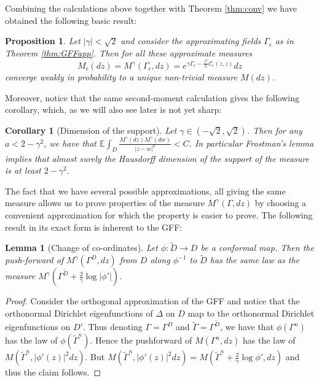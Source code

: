 \documentclass[11pt]{amsart}
\newtheorem{lemma}[thm]{Lemma}
\newtheorem{prop}[thm]{Proposition}
\newtheorem{cor}[thm]{Corollary}
\newcommand{\C}{\mathcal C}
\newcommand{\E}{\mathbb E}
\renewcommand{\1}{\mathbf 1}
\newcommand{\eps}{\epsilon}
\begin{document}
Combining the calculations above together with Theorem \ref{thm:conv} we have obtained the following basic result:

\begin{prop}\label{prop:basic}
Let $|\gamma| < \sqrt{2}$ and consider the approximating fields $\Gamma_\eps$ as in Theorem \ref{thm:GFFapp}. Then for all these approximate measures $$M_\eps(dz) = M^\gamma(\Gamma_\eps, dz) = e^{\gamma \Gamma_\eps - \frac{\gamma^2}{2}\C_\eps(z,z)}dz$$
converge weakly in probability to a unique non-trivial measure $M(dz)$.
\end{prop}

Moreover, notice that the same second-moment calculation gives the following corollary, which, as we will also see later is not yet sharp:

\begin{cor}[Dimension of the support]\label{cor:supp}
Let $\gamma \in (-\sqrt{2}, \sqrt{2})$. Then for any $a < 2-\gamma^2$, we have that $\E \int_D \frac{M^\gamma(dz)M^\gamma(dw)}{|z-w|^a} < C$. In particular Frostman's lemma implies that almost surely the Hausdorff dimension of the support of the measure is at least $2-\gamma^2$.
\end{cor}

The fact that we have several possible approximations, all giving the same measure allows us to prove properties of the measure $M^\gamma(\Gamma,dz)$ by choosing a convenient approximation for which the property is easier to prove. The following result in its exact form is inherent to the GFF:

\begin{lemma}[Change of co-ordinates]\label{lem:coc}
Let $\phi: \tilde D \to D$ be a conformal map. Then the push-forward of $M^\gamma(\Gamma^D, dz)$ from $D$ along $\phi^{-1}$ to $\tilde D$ has the same law as the measure $M^\gamma(\Gamma^{\tilde D} + \frac{2}{\gamma} \log |\phi'|)$.
\end{lemma}

\begin{proof}
Consider the orthogonal approximation of the GFF and notice that the orthonormal Dirichlet eigenfunctions of $\Delta$ on $D$ map to the orthonormal Dirichlet eigenfunctions on $D'$. Thus denoting $\Gamma = \Gamma^D$ and $\tilde \Gamma = \Gamma^{\tilde D}$, we have that $\phi(\Gamma^n)$ has the law of $\phi(\tilde \Gamma^n)$. Hence the pushforward of $M(\Gamma^n, dz)$ has the law of $M(\tilde \Gamma^n, |\phi'(z)|^2dz)$. But $M(\tilde \Gamma^n, |\phi'(z)|^2dz) = M(\tilde \Gamma^n + \frac{2}{\gamma} \log \phi', dz)$ and thus the claim follows.
\end{proof}
\end{document}
